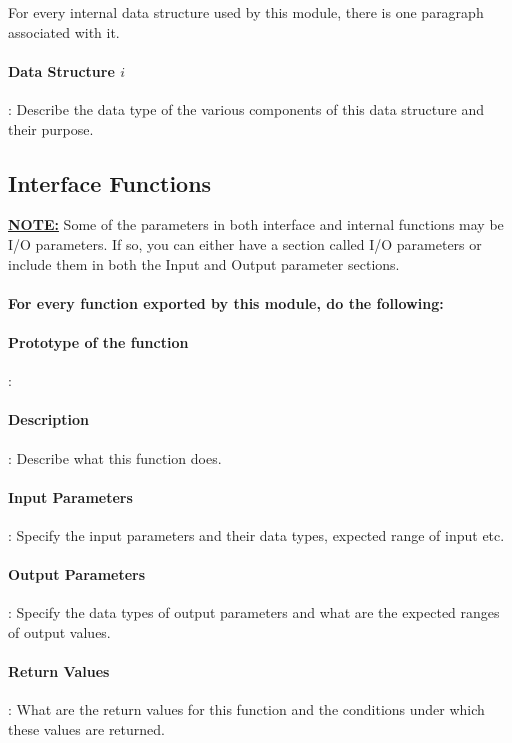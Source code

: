 \documentclass[a4paper,11pt]{article}
\begin{document}
For every internal data structure used by this module, there is one paragraph associated with it.

\paragraph{Data Structure $i$}: Describe the data type of the various components of this data structure and their purpose. 

\subsection{Interface Functions}
\label{if-func}

\underline{\textbf{NOTE:}} Some of the parameters in both interface and internal functions may be I/O parameters. If so, you can either have a section called I/O parameters or include them in both the Input and Output parameter sections.

\paragraph{For every function exported by this module, do the following:}

\paragraph{Prototype of the function}:

\paragraph{Description}: Describe what this function does.

\paragraph{Input Parameters}: Specify the input parameters and their data types, expected range of input etc.

\paragraph{Output Parameters}: Specify the data types of output parameters and what are the expected ranges of output values.

\paragraph{Return Values}: What are the return values for this function and the conditions under which these values are returned. 
\end{document}
